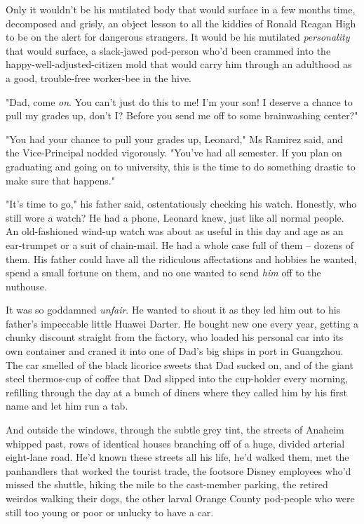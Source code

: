 Only it wouldn't be his mutilated body that would surface in a few
months time, decomposed and grisly, an object lesson to all the
kiddies of Ronald Reagan High to be on the alert for dangerous
strangers. It would be his mutilated \emph{personality} that would
surface, a slack-jawed pod-person who'd been crammed into the
happy-well-adjusted-citizen mold that would carry him through an
adulthood as a good, trouble-free worker-bee in the hive.

"Dad, come \emph{on}. You can't just do this to me! I'm your son! I
deserve a chance to pull my grades up, don't I? Before you send me
off to some brainwashing center?"

"You had your chance to pull your grades up, Leonard," Ms Ramirez
said, and the Vice-Principal nodded vigorously. "You've had all
semester. If you plan on graduating and going on to university,
this is the time to do something drastic to make sure that
happens."

"It's time to go," his father said, ostentatiously checking his
watch. Honestly, who still wore a watch? He had a phone, Leonard
knew, just like all normal people. An old-fashioned wind-up watch
was about as useful in this day and age as an ear-trumpet or a suit
of chain-mail. He had a whole case full of them -- dozens of them.
His father could have all the ridiculous affectations and hobbies
he wanted, spend a small fortune on them, and no one wanted to send
\emph{him} off to the nuthouse.

It was so goddamned \emph{unfair}. He wanted to shout it as they
led him out to his father's impeccable little Huawei Darter. He
bought new one every year, getting a chunky discount straight from
the factory, who loaded his personal car into its own container and
craned it into one of Dad's big ships in port in Guangzhou. The car
smelled of the black licorice sweets that Dad sucked on, and of the
giant steel thermos-cup of coffee that Dad slipped into the
cup-holder every morning, refilling through the day at a bunch of
diners where they called him by his first name and let him run a
tab.

And outside the windows, through the subtle grey tint, the streets
of Anaheim whipped past, rows of identical houses branching off of
a huge, divided arterial eight-lane road. He'd known these streets
all his life, he'd walked them, met the panhandlers that worked the
tourist trade, the footsore Disney employees who'd missed the
shuttle, hiking the mile to the cast-member parking, the retired
weirdos walking their dogs, the other larval Orange County
pod-people who were still too young or poor or unlucky to have a
car.

